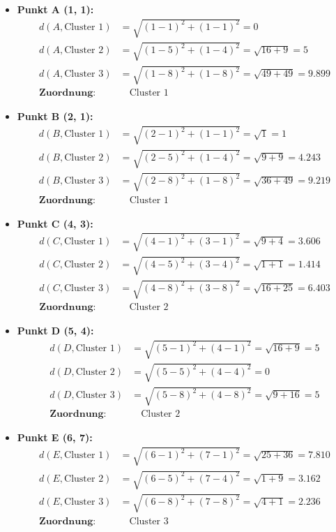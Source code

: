 \documentclass{article}
\begin{document}
\begin{itemize}
    \item \textbf{Punkt A (1, 1):}
    \begin{align*}
    d(A, \text{Cluster 1}) &= \sqrt{(1-1)^2 + (1-1)^2} = 0 \\
    d(A, \text{Cluster 2}) &= \sqrt{(1-5)^2 + (1-4)^2} = \sqrt{16 + 9} = 5 \\
    d(A, \text{Cluster 3}) &= \sqrt{(1-8)^2 + (1-8)^2} = \sqrt{49 + 49} = 9.899 \\
    \textbf{Zuordnung:} & \quad \text{Cluster 1}
    \end{align*}
    
    \item \textbf{Punkt B (2, 1):}
    \begin{align*}
    d(B, \text{Cluster 1}) &= \sqrt{(2-1)^2 + (1-1)^2} = \sqrt{1} = 1 \\
    d(B, \text{Cluster 2}) &= \sqrt{(2-5)^2 + (1-4)^2} = \sqrt{9 + 9} = 4.243 \\
    d(B, \text{Cluster 3}) &= \sqrt{(2-8)^2 + (1-8)^2} = \sqrt{36 + 49} = 9.219 \\
    \textbf{Zuordnung:} & \quad \text{Cluster 1}
    \end{align*}
    
    \item \textbf{Punkt C (4, 3):}
    \begin{align*}
    d(C, \text{Cluster 1}) &= \sqrt{(4-1)^2 + (3-1)^2} = \sqrt{9 + 4} = 3.606 \\
    d(C, \text{Cluster 2}) &= \sqrt{(4-5)^2 + (3-4)^2} = \sqrt{1 + 1} = 1.414 \\
    d(C, \text{Cluster 3}) &= \sqrt{(4-8)^2 + (3-8)^2} = \sqrt{16 + 25} = 6.403 \\
    \textbf{Zuordnung:} & \quad \text{Cluster 2}
    \end{align*}
    
    \item \textbf{Punkt D (5, 4):}
    \begin{align*}
    d(D, \text{Cluster 1}) &= \sqrt{(5-1)^2 + (4-1)^2} = \sqrt{16 + 9} = 5 \\
    d(D, \text{Cluster 2}) &= \sqrt{(5-5)^2 + (4-4)^2} = 0 \\
    d(D, \text{Cluster 3}) &= \sqrt{(5-8)^2 + (4-8)^2} = \sqrt{9 + 16} = 5 \\
    \textbf{Zuordnung:} & \quad \text{Cluster 2}
    \end{align*}
    
    \item \textbf{Punkt E (6, 7):}
    \begin{align*}
    d(E, \text{Cluster 1}) &= \sqrt{(6-1)^2 + (7-1)^2} = \sqrt{25 + 36} = 7.810 \\
    d(E, \text{Cluster 2}) &= \sqrt{(6-5)^2 + (7-4)^2} = \sqrt{1 + 9} = 3.162 \\
    d(E, \text{Cluster 3}) &= \sqrt{(6-8)^2 + (7-8)^2} = \sqrt{4 + 1} = 2.236 \\
    \textbf{Zuordnung:} & \quad \text{Cluster 3}
    \end{align*}
    

\end{itemize}
\end{document}
